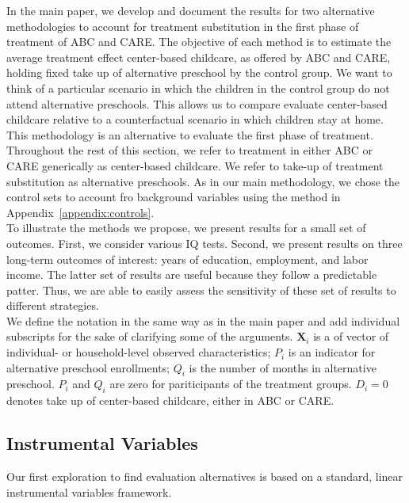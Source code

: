 \begin{appendices}
\noindent In the main paper, we develop and document the results for two alternative methodologies to account for treatment substitution in the first phase of treatment of ABC and CARE. The objective of each method is to estimate the average treatment effect center-based childcare, as offered by ABC and CARE, holding fixed take up of alternative preschool by the control group. We want to think of a particular scenario in which the children in the control group do not attend alternative preschools. This allows us to compare evaluate center-based childcare relative to a counterfactual scenario in which children stay at home.\\

\noindent This methodology is an alternative to evaluate the first phase of treatment. Throughout the rest of this section, we refer to treatment in either ABC or CARE generically as center-based childcare. We refer to take-up of treatment substitution as alternative preschools. As in our main methodology, we chose the control sets to account fro background variables using the method in Appendix~\ref{appendix:controls}.\\

\noindent To illustrate the methods we propose, we present results for a small set of outcomes. First, we consider various IQ tests. Second, we present results on three long-term outcomes of interest: years of education, employment, and labor income. The latter set of results are useful because they follow a predictable patter. Thus, we are able to easily assess the sensitivity of these set of results to different strategies.\\

\noindent We define the notation in the same way as in the main paper and add individual subscripts for the sake of clarifying some of the arguments. $\mathbf{X}_{i}$ is a of vector of individual- or household-level observed characteristics; $P_i$ is an indicator for alternative preschool enrollments; $Q_{i}$ is the number of months in alternative preschool. $P_i$ and $Q_i$ are zero for pariticipants of the treatment groups. $D_i=0$ denotes take up of center-based childcare, either in ABC or CARE.

\subsection{Instrumental Variables}

\noindent Our first exploration to find evaluation alternatives is based on a standard, linear instrumental variables framework.


\end{appendices}
